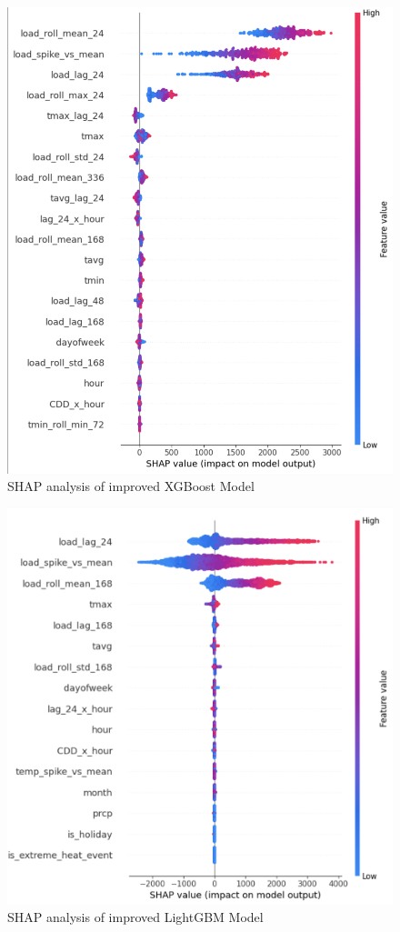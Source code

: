\documentclass[final,numbered]{ifacconf}
\begin{document}
\begin{figure}[htbp]
    \centering
    \includegraphics[width=1\linewidth]{shapboost.png} 
    \caption{SHAP analysis of improved XGBoost Model}
    \label{fig:load_patterns}
\end{figure}

\begin{figure}[htbp]
    \centering
    \includegraphics[width=1\linewidth]{shaplightgbm.png} 
    \caption{SHAP analysis of improved LightGBM Model}
    \label{fig:load_patterns}
\end{figure}



\end{document}
